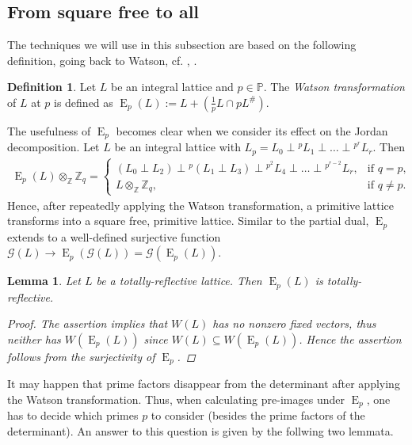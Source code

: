 \documentclass{amsart}
\newtheorem{lem}[thm]{Lemma}
\theoremstyle{definition}
\newtheorem{defn}[thm]{Definition}
\theoremstyle{remark}
\def\ZZ{\mathbb{Z}}
\def\PP{\mathbb{P}}
\def\CG{{\mathcal G}}
\def\CG{{\mathcal G}}
\DeclareMathOperator{\E}{E}
\begin{document}
\subsection{From square free to all}
The techniques we will use in this subsection are based on the following definition, going back to Watson, cf. \cite{wat62}, \cite{wat73}.
\begin{defn}
Let $L$ be an integral lattice and $p \in \PP$. The \emph{Watson transformation} of $L$ at $p$ is defined as $\E_p(L):=L + (\tfrac{1}{p}L \cap pL^{\#})$.
\end{defn}
The usefulness of $\E_p$ becomes clear when we consider its effect on the Jordan decomposition. Let $L$ be an integral lattice with
$L_p = L_0 \perp {}^{p}\!{L_1} \perp \dots \perp {}^{p^r}\!{L_r}$. Then
\begin{align*}
 \E_p(L) \otimes_{\ZZ} \ZZ_q =
 \begin{cases}
  \left(L_0 \perp L_2\right) \perp {}^{p}\!{\left(L_1 \perp L_3\right)} \perp {}^{p^2}\!{L_4} \perp \dots \perp {}^{p^{r-2}}\!{L_r}  , & \text{if $q = p$}, \\
  L \otimes_{\ZZ} \ZZ_q,      & \text{if $q \neq p$}.
 \end{cases}
\end{align*}
Hence, after repeatedly applying the Watson transformation, a primitive lattice transforms into a square free, primitive lattice. 
Similar to the partial dual,
$\E_p$ extends to a well-defined surjective function $\CG(L) \longrightarrow \E_p(\CG(L)) = \CG(\E_p(L))$.
\begin{lem}
 Let $L$ be a totally-reflective lattice. Then $\E_p(L)$ is totally-reflective.
 \begin{proof}
 The assertion implies that $W(L)$ has no nonzero fixed vectors, thus neither has $W(\E_p(L))$ since $W(L) \subseteq W(\E_p(L))$. Hence the assertion follows from the surjectivity of $\E_p$.
 \end{proof}
\end{lem}
It may happen that prime factors disappear from the determinant after applying the Watson transformation.
Thus, when calculating pre-images under $\E_p$, one has to decide which primes $p$ to consider (besides the prime factors of the determinant).
An answer to this question is given by the follwing two lemmata.
\end{document}
